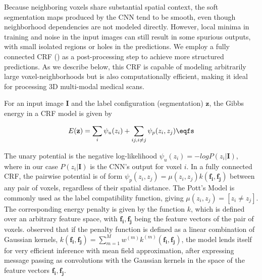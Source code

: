 Because neighboring voxels share substantial spatial context, the soft segmentation maps produced by the CNN tend to be smooth, even though neighborhood dependencies are not modeled directly. However, local minima in training and noise in the input images can still result in some spurious outputs, with small isolated regions or holes in the predictions. We employ a fully connected CRF (\cite{Krahenbuhl2013}) as a post-processing step to achieve more structured predictions. As we describe below, this CRF is capable of modeling arbitrarily large voxel-neighborhoods but is also computationally efficient, making it ideal for processing 3D multi-modal medical scans.

For an input image $\mathbf{I}$ and the label configuration (segmentation) $\mathbf{z}$, the Gibbs energy in a CRF model is given by

\begin{equation}
E(\mathbf{z}) = \sum_i{\psi_u(z_i)} + \sum_{ij, i \neq j}{\psi_p(z_i,z_j)} \eqfs
\end{equation}

The unary potential is the negative log-likelihood $\psi_u(z_i) = -logP(z_i|\mathbf{I})$, where in our case $P(z_i|\mathbf{I})$ is the CNN's output for voxel $i$. In a fully connected CRF, the pairwise potential is of form $\psi_p(z_i,z_j) = \mu(z_i,z_j) k(\mathbf{f_i},\mathbf{f_j})$ between any pair of voxels, regardless of their spatial distance. The Pott's Model is commonly used as the label compatibility function, giving $\mu(z_i,z_j)=[z_i \neq z_j]$. The corresponding energy penalty is given by the function $k$, which is defined over an arbitrary feature space, with $\mathbf{f_i},\mathbf{f_j}$ being the feature vectors of the pair of voxels. \cite{Krahenbuhl2013} observed that if the penalty function is defined as a linear combination of Gaussian kernels, $k(\mathbf{f_i},\mathbf{f_j}) = \sum_{m=1}^{M} {w^{(m)}k^{(m)}(\mathbf{f_i},\mathbf{f_j})}$, the model lends itself for very efficient inference with mean field approximation, after expressing message passing as convolutions with the Gaussian kernels in the space of the feature vectors $\mathbf{f_i},\mathbf{f_j}$.

